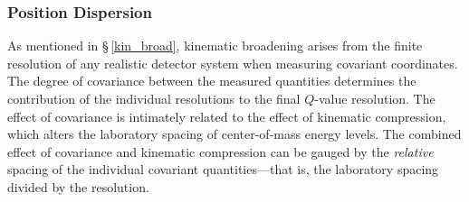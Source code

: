 \subsubsection{Position Dispersion}
As mentioned in \S\,\ref{kin_broad}, kinematic broadening arises from the finite resolution of any realistic detector  system when measuring covariant coordinates. %
The degree of covariance between the measured quantities %
determines the contribution of the individual resolutions %
to the final $Q$-value resolution.  %
The effect of covariance is intimately related to the effect of kinematic compression, which alters the laboratory spacing of center-of-mass energy levels.  The combined effect of covariance and kinematic compression can be gauged by the \textit{relative} spacing of the individual covariant quantities---that is, the laboratory spacing divided by the resolution.%

